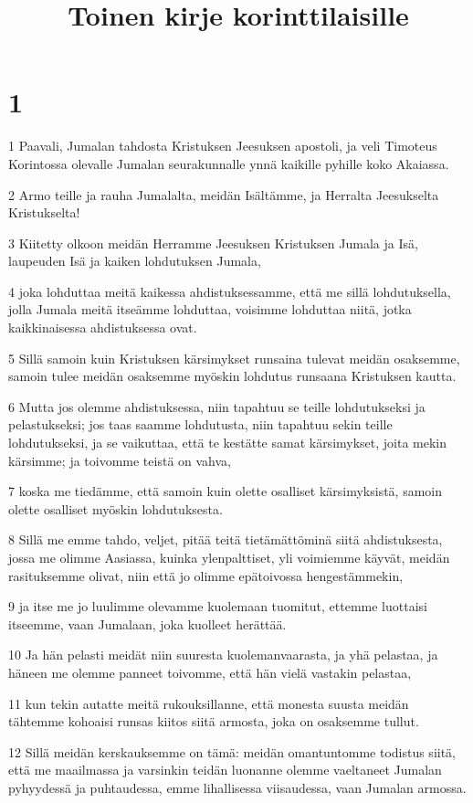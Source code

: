 

\title{Toinen kirje korinttilaisille}


\chapter{1}

\par 1 Paavali, Jumalan tahdosta Kristuksen Jeesuksen apostoli, ja veli Timoteus Korintossa olevalle Jumalan seurakunnalle ynnä kaikille pyhille koko Akaiassa.
\par 2 Armo teille ja rauha Jumalalta, meidän Isältämme, ja Herralta Jeesukselta Kristukselta!
\par 3 Kiitetty olkoon meidän Herramme Jeesuksen Kristuksen Jumala ja Isä, laupeuden Isä ja kaiken lohdutuksen Jumala,
\par 4 joka lohduttaa meitä kaikessa ahdistuksessamme, että me sillä lohdutuksella, jolla Jumala meitä itseämme lohduttaa, voisimme lohduttaa niitä, jotka kaikkinaisessa ahdistuksessa ovat.
\par 5 Sillä samoin kuin Kristuksen kärsimykset runsaina tulevat meidän osaksemme, samoin tulee meidän osaksemme myöskin lohdutus runsaana Kristuksen kautta.
\par 6 Mutta jos olemme ahdistuksessa, niin tapahtuu se teille lohdutukseksi ja pelastukseksi; jos taas saamme lohdutusta, niin tapahtuu sekin teille lohdutukseksi, ja se vaikuttaa, että te kestätte samat kärsimykset, joita mekin kärsimme; ja toivomme teistä on vahva,
\par 7 koska me tiedämme, että samoin kuin olette osalliset kärsimyksistä, samoin olette osalliset myöskin lohdutuksesta.
\par 8 Sillä me emme tahdo, veljet, pitää teitä tietämättöminä siitä ahdistuksesta, jossa me olimme Aasiassa, kuinka ylenpalttiset, yli voimiemme käyvät, meidän rasituksemme olivat, niin että jo olimme epätoivossa hengestämmekin,
\par 9 ja itse me jo luulimme olevamme kuolemaan tuomitut, ettemme luottaisi itseemme, vaan Jumalaan, joka kuolleet herättää.
\par 10 Ja hän pelasti meidät niin suuresta kuolemanvaarasta, ja yhä pelastaa, ja häneen me olemme panneet toivomme, että hän vielä vastakin pelastaa,
\par 11 kun tekin autatte meitä rukouksillanne, että monesta suusta meidän tähtemme kohoaisi runsas kiitos siitä armosta, joka on osaksemme tullut.
\par 12 Sillä meidän kerskauksemme on tämä: meidän omantuntomme todistus siitä, että me maailmassa ja varsinkin teidän luonanne olemme vaeltaneet Jumalan pyhyydessä ja puhtaudessa, emme lihallisessa viisaudessa, vaan Jumalan armossa.

